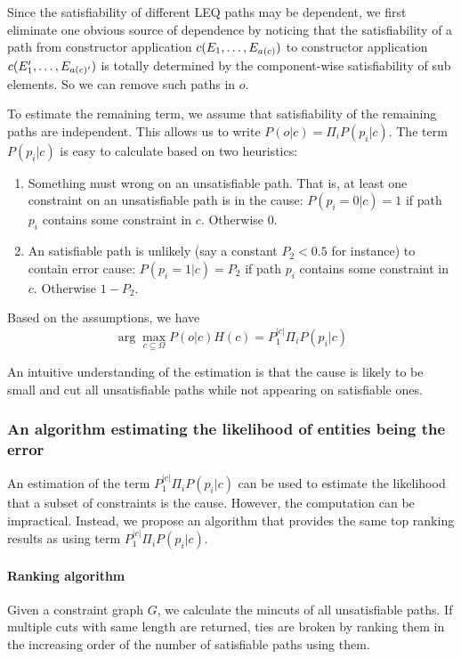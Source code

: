 Since the satisfiability of different LEQ paths may be dependent, we first
eliminate one obvious source of dependence by noticing that the satisfiability
of a path from constructor application $c(E_1, \dots, E_{a(c)})$ to
constructor application $c(E_1', \dots, E_{a(c)'})$ is totally determined
by the component-wise satisfiability of sub elements. So we can remove such
paths in $o$.

To estimate the remaining term, we assume that satisfiability of the remaining
paths are independent. This allows us to write $P(o|c) = \Pi_i P(p_i|c)$. The
term $P(p_i|c)$ is easy to calculate based on two heuristics:

\begin{enumerate}
\item Something must wrong on an unsatisfiable path. That is, at least one
constraint on an unsatisfiable path is in the cause: $P(p_i=0|c) = 1$ if path
$p_i$ contains some constraint in $c$. Otherwise 0.

\item An satisfiable path is unlikely (say a constant $P_2<0.5$ for instance)
to contain error cause: $P(p_i=1|c) = P_2$ if path $p_i$ contains some
constraint in $c$.  Otherwise $1-P_2$.  
\end{enumerate}

Based on the assumptions, we have
\[\arg\max_{c \subseteq \Omega} P(o|c) H(c) = P_1^{|c|} \Pi_i P(p_i|c) \]

An intuitive understanding of the estimation is that the cause is likely to be
small and cut all unsatisfiable paths while not appearing on satisfiable ones.

\subsubsection{An algorithm estimating the likelihood of entities being the error}
\label{sec:rankingalg}

An estimation of the term $P_1^{|c|} \Pi_i P(p_i|c)$ can be used to estimate
the likelihood that a subset of constraints is the cause. However, the
computation can be impractical. Instead, we propose an algorithm that provides
the same top ranking results as using term $P_1^{|c|} \Pi_i P(p_i|c)$.

\paragraph{Ranking algorithm}

Given a constraint graph $G$, we calculate the mincuts of all unsatisfiable
paths. If multiple cuts with same length are returned, ties are broken by
ranking them in the increasing order of the number of satisfiable paths using
them.

